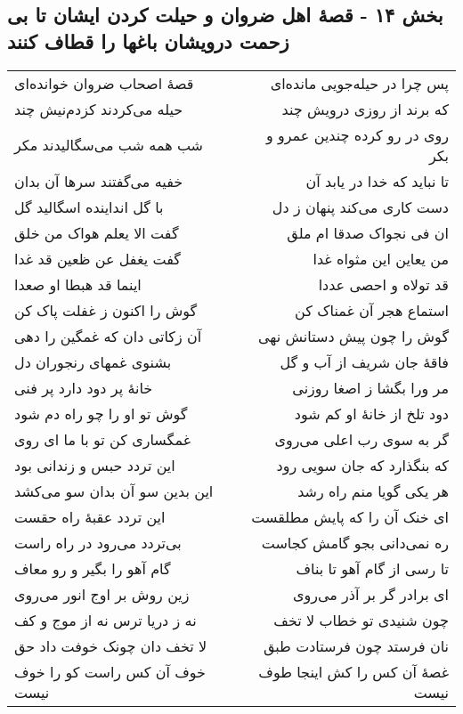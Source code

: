 \begin{center}
\section*{بخش ۱۴ - قصهٔ اهل ضروان و حیلت کردن ایشان تا بی زحمت درویشان باغها را قطاف کنند}
\label{sec:sh014}
\begin{longtable}{l p{0.5cm} r}
قصهٔ اصحاب ضروان خوانده‌ای
&&
پس چرا در حیله‌جویی مانده‌ای
\\
حیله می‌کردند کزدم‌نیش چند
&&
که برند از روزی درویش چند
\\
شب همه شب می‌سگالیدند مکر
&&
روی در رو کرده چندین عمرو و بکر
\\
خفیه می‌گفتند سرها آن بدان
&&
تا نباید که خدا در یابد آن
\\
با گل انداینده اسگالید گل
&&
دست کاری می‌کند پنهان ز دل
\\
گفت الا یعلم هواک من خلق
&&
ان فی نجواک صدقا ام ملق
\\
گفت یغفل عن ظعین قد غدا
&&
من یعاین این مثواه غدا
\\
اینما قد هبطا او صعدا
&&
قد تولاه و احصی عددا
\\
گوش را اکنون ز غفلت پاک کن
&&
استماع هجر آن غمناک کن
\\
آن زکاتی دان که غمگین را دهی
&&
گوش را چون پیش دستانش نهی
\\
بشنوی غمهای رنجوران دل
&&
فاقهٔ جان شریف از آب و گل
\\
خانهٔ پر دود دارد پر فنی
&&
مر ورا بگشا ز اصغا روزنی
\\
گوش تو او را چو راه دم شود
&&
دود تلخ از خانهٔ او کم شود
\\
غمگساری کن تو با ما ای روی
&&
گر به سوی رب اعلی می‌روی
\\
این تردد حبس و زندانی بود
&&
که بنگذارد که جان سویی رود
\\
این بدین سو آن بدان سو می‌کشد
&&
هر یکی گویا منم راه رشد
\\
این تردد عقبهٔ راه حقست
&&
ای خنک آن را که پایش مطلقست
\\
بی‌تردد می‌رود در راه راست
&&
ره نمی‌دانی بجو گامش کجاست
\\
گام آهو را بگیر و رو معاف
&&
تا رسی از گام آهو تا بناف
\\
زین روش بر اوج انور می‌روی
&&
ای برادر گر بر آذر می‌روی
\\
نه ز دریا ترس نه از موج و کف
&&
چون شنیدی تو خطاب لا تخف
\\
لا تخف دان چونک خوفت داد حق
&&
نان فرستد چون فرستادت طبق
\\
خوف آن کس راست کو را خوف نیست
&&
غصهٔ آن کس را کش اینجا طوف نیست
\\
\end{longtable}
\end{center}
